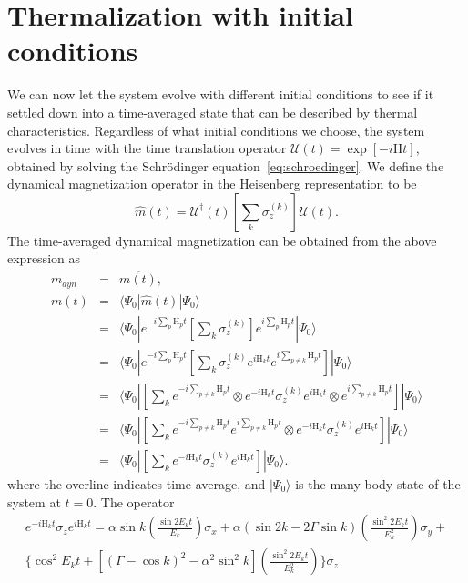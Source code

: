 \documentclass[a4paper,10pt]{article}
\begin{document}
\section{\sc Thermalization with initial conditions}
We can now let the system evolve with different initial conditions to see if it settled down into a time-averaged state that can be described by thermal characteristics. Regardless of what initial conditions we choose, the system evolves in time with the time translation operator $\mathcal{U}(t)=\exp{\left[-i\mathrm{H}t\right]}$, obtained by solving the Schr\"odinger equation~\ref{eq:schroedinger}. We define the dynamical magnetization operator in the Heisenberg representation to be
\begin{equation}
\label{eq:mopdef}
\hat{m}(t) = \mathcal{U}^\dagger (t)\left[\sum_k\sigma^{(k)}_z\right] \mathcal{U}(t).
\end{equation}
The time-averaged dynamical magnetization can be obtained from the above expression as
\begin{eqnarray}
\label{eq:mdyn}
m_{dyn}&=&\overline{m(t)},\nonumber \\
m(t)   &=& \langle \Psi_0 |\hat{m}(t)|\Psi_0 \rangle \nonumber \\
       &=& \langle \Psi_0 |e^{-i\sum_p\mathrm{H}_p t}\left[\sum_k\sigma^{(k)}_z\right]e^{i\sum_p\mathrm{H}_p t}|\Psi_0\rangle \nonumber \\
       &=& \langle \Psi_0 |e^{-i\sum_p\mathrm{H}_p t}\left[\sum_k\sigma^{(k)}_z e^{i\mathrm{H}_k t} e^{i\sum_{p\neq k}\mathrm{H}_p t}\right]|\Psi_0\rangle \nonumber \\
       &=&\langle \Psi_0 |\left[\sum_k e^{-i\sum_{p\neq k}\mathrm{H}_p t}\otimes e^{-i\mathrm{H}_k t}\sigma^{(k)}_z e^{i\mathrm{H}_k t} \otimes e^{i\sum_{p\neq k}\mathrm{H}_p t}\right]|\Psi_0\rangle \nonumber \\
       &=& \langle \Psi_0 |\left[\sum_k e^{-i\sum_{p\neq k}\mathrm{H}_p t}e^{i\sum_{p\neq k}\mathrm{H}_p t}\otimes e^{-i\mathrm{H}_k t}\sigma^{(k)}_z e^{i\mathrm{H}_k t} \right]|\Psi_0\rangle \nonumber \\
       &=& \langle \Psi_0 |\left[\sum_k e^{-i\mathrm{H}_k t}\sigma^{(k)}_z e^{i\mathrm{H}_k t} \right]|\Psi_0\rangle.
\end{eqnarray}
where the overline indicates time average, and $|\Psi_0\rangle$ is the many-body state of the system at $t=0$. The operator
\begin{multline}
e^{-i\mathrm{H}_k t}\sigma_z e^{i\mathrm{H}_k t} =\alpha \sin{k}\left(\frac{\sin{2E_kt}}{E_k}\right)\sigma_x+
\alpha\left(\sin{2k}-2\Gamma\sin{k}\right)\left(\frac{\sin^2{2E_kt}}{E^2_k}\right)\sigma_y+\\
\bigg\{\cos^2{E_kt}+\left[\left(\Gamma-\cos{k}\right)^2-\alpha^2\sin^2{k}\right]\left(\frac{\sin^2{2E_kt}}{E^2_k}\right)\bigg\}\sigma_z
\end{multline}
\end{document}
